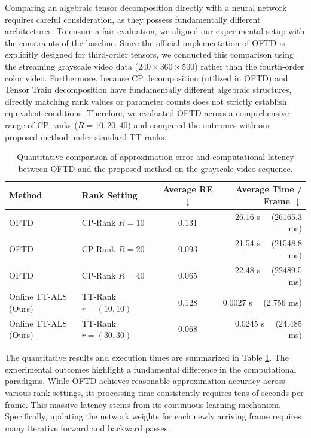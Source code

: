 \documentclass[a4paper, 11pt]{article}
\theoremstyle{plain}
\theoremstyle{definition}
\theoremstyle{remark}
\begin{document}
Comparing an algebraic tensor decomposition directly with a neural network requires careful consideration, as they possess fundamentally different architectures.
To ensure a fair evaluation, we aligned our experimental setup with the constraints of the baseline.
Since the official implementation of OFTD is explicitly designed for third-order tensors, we conducted this comparison using the streaming grayscale video data ($240 \times 360 \times 500$) rather than the fourth-order color video.
Furthermore, because CP decomposition (utilized in OFTD) and Tensor Train decomposition have fundamentally different algebraic structures, directly matching rank values or parameter counts does not strictly establish equivalent conditions.
Therefore, we evaluated OFTD across a comprehensive range of CP-ranks ($R = 10, 20, 40$) and compared the outcomes with our proposed method under standard TT-ranks.

\begin{table}[t]
    \centering
    \caption{Quantitative comparison of approximation error and computational latency between OFTD and the proposed method on the grayscale video sequence.}
    \label{tab:comparison_oftd}
        \begin{tabular}{l l c r}
            \toprule
            \textbf{Method} & \textbf{Rank Setting} & \textbf{Average RE} $\downarrow$ & \textbf{Average Time / Frame} $\downarrow$ \\
            \midrule
            OFTD & CP-Rank $R=10$ & 0.131 & 26.16 s \ \ (26165.3 ms) \\
            OFTD & CP-Rank $R=20$ & 0.093 & 21.54 s \ \ (21548.8 ms) \\
            OFTD & CP-Rank $R=40$ & 0.065 & 22.48 s \ \ (22489.5 ms) \\
            \midrule
            Online TT-ALS (Ours) & TT-Rank $r=(10, 10)$ & 0.128 & 0.0027 s \ \ (2.756 ms) \\
            Online TT-ALS (Ours) & TT-Rank $r=(30, 30)$ & 0.068 & 0.0245 s \ \ (24.485 ms) \\
            \bottomrule
        \end{tabular}
\end{table}

The quantitative results and execution times are summarized in Table \ref{tab:comparison_oftd}.
The experimental outcomes highlight a fundamental difference in the computational paradigms.
While OFTD achieves reasonable approximation accuracy across various rank settings, its processing time consistently requires tens of seconds per frame.
This massive latency stems from its continuous learning mechanism.
Specifically, updating the network weights for each newly arriving frame requires many iterative forward and backward passes.
\end{document}
